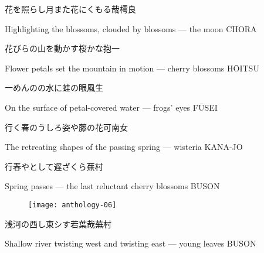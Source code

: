 \begin{haiku}
    {\FH 花を照らし月また花にくもる哉}\hfill{\FH 樗良}

    \vin{} Highlighting the blossoms,
    \vin{} \vin{} clouded by blossoms ---
    \vin{} \vin{} \vin{} the moon \hspace{\fill} CHORA
\end{haiku}

\begin{haiku}
    {\FH 花びらの山を動かす桜かな}\hfill{\FH 抱一}

    \vin{} Flower petals
    \vin{} \vin{} set the mountain in motion ---
    \vin{} \vin{} \vin{} cherry blossoms \hspace{\fill} H\={O}ITSU
\end{haiku}

\begin{haiku}
    {\FH 一めんのの水に蛙の眼}\hfill{\FH 風生}

    \vin{} On the surface
    \vin{} \vin{} of petal-covered water ---
    \vin{} \vin{} \vin{} frogs' eyes \hspace{\fill} F\={U}SEI
\end{haiku}

\begin{haiku}
    {\FH 行く春のうしろ姿や藤の花}\hfill{\FH 可南女}

    \vin{} The retreating shapes
    \vin{} \vin{} of the passing spring ---
    \vin{} \vin{} \vin{} wisteria \hspace{\fill} KANA-JO
\end{haiku}

\begin{haiku}
    {\FH 行春やとして遅ざくら}\hfill{\FH 蕪村}

    \vin{} Spring passes ---
    \vin{} \vin{} the last reluctant
    \vin{} \vin{} \vin{} cherry blossoms \hspace{\fill} BUSON
\end{haiku}

\begin{figure}
    \texttt{[image: anthology-06]}
\end{figure}

\begin{haiku}
    {\FH 浅河の西し東シす若葉哉}\hfill{\FH 蕪村}

    \vin{} Shallow river
    \vin{} \vin{} twisting west and twisting east ---
    \vin{} \vin{} \vin{} young leaves \hspace{\fill} BUSON
\end{haiku}

